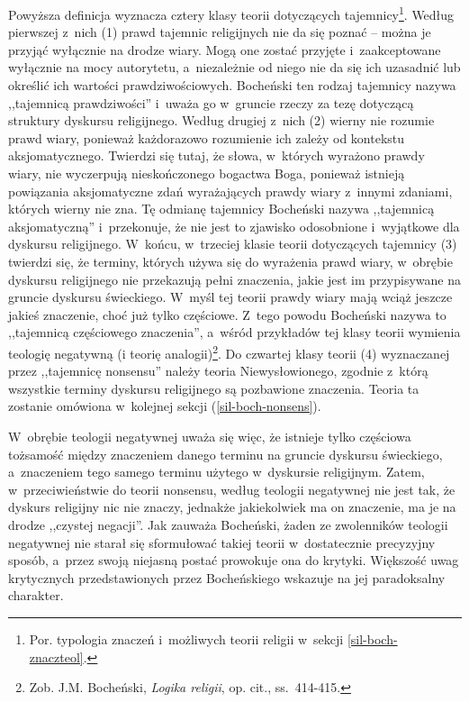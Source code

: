 Powyższa definicja wyznacza cztery klasy teorii dotyczących tajemnicy\footnote{Por. typologia znaczeń i~możliwych teorii religii w~sekcji \ref{sil-boch-znaczteol}.}. Według pierwszej z~nich (1) prawd tajemnic religijnych nie da się poznać -- można je przyjąć wyłącznie na drodze wiary. Mogą one zostać przyjęte i~zaakceptowane wyłącznie na mocy autorytetu, a~niezależnie od niego nie da się ich uzasadnić lub określić ich wartości prawdziwościowych. Bocheński ten rodzaj tajemnicy nazywa ,,tajemnicą prawdziwości'' i~uważa go w~gruncie rzeczy za tezę dotyczącą struktury dyskursu religijnego. Według drugiej z~nich (2) wierny nie rozumie prawd wiary, ponieważ każdorazowo rozumienie ich zależy od kontekstu aksjomatycznego. Twierdzi się tutaj, że słowa, w~których wyrażono prawdy wiary, nie wyczerpują nieskończonego bogactwa Boga, ponieważ istnieją powiązania aksjomatyczne zdań wyrażających prawdy wiary z~innymi zdaniami, których wierny nie zna. Tę odmianę tajemnicy Bocheński nazywa ,,tajemnicą aksjomatyczną'' i~przekonuje, że nie jest to zjawisko odosobnione i~wyjątkowe dla dyskursu religijnego. W~końcu, w~trzeciej klasie teorii dotyczących tajemnicy (3) twierdzi się, że terminy, których używa się do wyrażenia prawd wiary, w~obrębie dyskursu religijnego nie przekazują pełni znaczenia, jakie jest im przypisywane na gruncie dyskursu świeckiego. W~myśl tej teorii prawdy wiary mają wciąż jeszcze jakieś znaczenie, choć już tylko częściowe. Z~tego powodu Bocheński nazywa to ,,tajemnicą częściowego znaczenia'', a~wśród przykładów tej klasy teorii wymienia teologię negatywną (i teorię analogii)\footnote{Zob. J.M. Bocheński, \textit{Logika religii}, op. cit., ss.~414-415.}. Do czwartej klasy teorii (4) wyznaczanej przez ,,tajemnicę nonsensu'' należy teoria Niewysłowionego, zgodnie z~którą wszystkie terminy dyskursu religijnego są pozbawione znaczenia. Teoria ta zostanie omówiona w~kolejnej sekcji (\ref{sil-boch-nonsens}).

W~obrębie teologii negatywnej uważa się więc, że istnieje tylko częściowa tożsamość między znaczeniem danego terminu na gruncie dyskursu świeckiego, a~znaczeniem tego samego terminu użytego w~dyskursie religijnym. Zatem, w~przeciwieństwie do teorii nonsensu, według teologii negatywnej nie jest tak, że dyskurs religijny nic nie znaczy, jednakże jakiekolwiek ma on znaczenie, ma je na drodze ,,czystej negacji''. Jak zauważa Bocheński, żaden ze zwolenników teologii negatywnej nie starał się sformułować takiej teorii w~dostatecznie precyzyjny sposób, a~przez swoją niejasną postać prowokuje ona do krytyki. Większość uwag krytycznych przedstawionych przez Bocheńskiego wskazuje na jej paradoksalny charakter.

